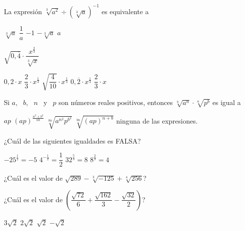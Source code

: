 \documentclass[revolver]{srs}
\begin{document}
\begin{preguntas}[after-item-skip=2cm]
\pregunta La expresión $\sqrt[3]{a^2} \div \left(\sqrt[3]{a}\right)^{-1}$ es equivalente a
\begin{vertical}
\alternativa $\sqrt[3]{a}$
\alternativa $\dfrac{1}{a}$
\alternativa $-1$
\alternativa $-\sqrt[3]{a}$
\alternativa $a$
\end{vertical}

\pregunta $\sqrt{0,\overline{4}} \cdot \dfrac{x^{\frac{2}{3}}}{\sqrt[3]{x}}$
\begin{vertical}
\alternativa $0,2\cdot x$
\alternativa $\dfrac{2}{3}\cdot x^{\frac{1}{3}}$
\alternativa $\sqrt{\dfrac{4}{10}} \cdot x^{\frac{1}{3}}$
\alternativa $0,\overline{2} \cdot x^{\frac{1}{3}}$
\alternativa $\dfrac{2}{3} \cdot x$
\end{vertical}

\pregunta Si $a$,~ $b$,~ $n$~ y~ $p$ son números reales positivos, entonces $\sqrt[b]{a^n} \cdot \sqrt[n]{p^b}$ es igual a
\begin{vertical}
\alternativa $ap$
\alternativa $\left(ap\right)^{\frac{n^2+b^2}{nb}}$
\alternativa $\sqrt[bn]{a^{n^2} p^{b^2}}$
\alternativa $\sqrt[bn]{\left(ap\right)^{n+b}}$
\alternativa ninguna de las expresiones.
\end{vertical}

\pregunta ¿Cuál de las siguientes igualdades es FALSA?
\begin{vertical}
\alternativa $-25^{\frac{1}{2}} = -5$
\alternativa $4^{-\frac{1}{2}} = \dfrac{1}{2}$
\alternativa $32^{\frac{5}{3}} = 8$
\alternativa $8^{\frac{2}{3}} = 4$
\end{vertical}


\pregunta ¿Cuál es el valor de $\sqrt{289} - \sqrt[3]{-125} + \sqrt[4]{256}$?
\begin{vertical}
\end{vertical}

\pregunta ¿Cuál es el valor de $\left(\dfrac{\sqrt{72}}{6} + \dfrac{\sqrt{162}}{3} - \dfrac{\sqrt{32}}{2}\right)$?
\begin{vertical}
\alternativa $3\sqrt{2}$
\alternativa $2\sqrt{2}$
\alternativa $\sqrt{2}$
\alternativa $-\sqrt{2}$
\end{vertical}


\end{preguntas}
\end{document}
